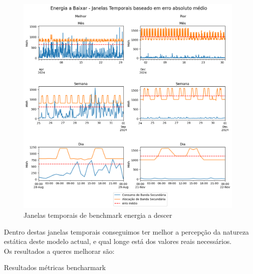 \begin{figure}[H]
    \centering
    \includegraphics[width=\textwidth]{plots/alocacoes_temporais_downward_dataset.png}
    \caption{Janelas temporais de benchmark energia a descer}
    \label{fig:benchmarktimewindowsdown}
\end{figure}

Dentro destas janelas temporais conseguimos ter melhor a percepção da natureza estática deste modelo actual, e qual longe está dos valores reais necessários.\\

Os resultados a queres melhorar são:\\
\begin{table}[H]
    \caption{Resultados métricas bencharmark}    
    \resizebox{\linewidth}{!}{}
    \label{tab:benchmarkmetrics}
    \end{table}